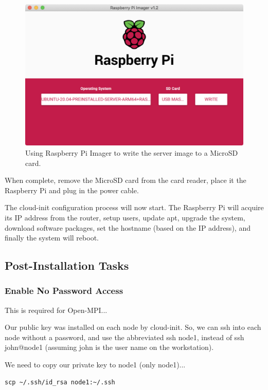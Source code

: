 \documentclass{article}
\begin{document}
\begin{figure}
	\centering	
	\includegraphics[width=1.0\textwidth]{screenshots/imager-write.png}
	\caption{Using Raspberry Pi Imager to write the server image to a MicroSD card.}
\end{figure}

When complete, remove the MicroSD card from the card reader, place it the Raspberry Pi and plug in the power cable.

The cloud-init configuration process will now start. The Raspberry Pi will acquire its IP address from the router, setup users, update apt, upgrade the system, download software packages, set the hostname (based on the IP address), and finally the system will reboot.


\subsection{Post-Installation Tasks}

\subsubsection{Enable No Password Access}

This is required for Open-MPI...

Our public key was installed on each node by cloud-init. So, we can ssh into each node without a password, and use the abbreviated ssh node1, instead of ssh john@node1 (assuming john is the user name on the workstation).

We need to copy our private key to node1 (only node1)...

\lstset{frameround=tttt}
\begin{lstlisting}[frame=single]
scp ~/.ssh/id_rsa node1:~/.ssh
\end{lstlisting}
\end{document}
